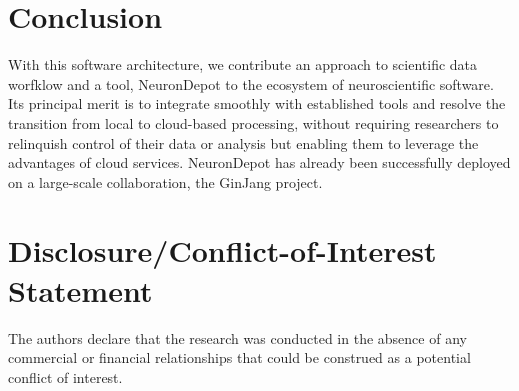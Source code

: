 \documentclass{frontiersSCNS} %
\begin{document}
\section{Conclusion}
With this software architecture, we contribute an approach to scientific data
worfklow and a tool, NeuronDepot to the ecosystem of neuroscientific software.
Its principal merit is to integrate smoothly with established tools and resolve
the transition from local to cloud-based processing, without requiring
researchers to relinquish control of their data or analysis but enabling them
to leverage the advantages of cloud services. NeuronDepot has already been
successfully deployed on a large-scale collaboration, the GinJang project.


\section*{Disclosure/Conflict-of-Interest Statement}

The authors declare that the research was conducted in the absence of any commercial or financial relationships that could be construed as a potential conflict of interest.
\end{document}
